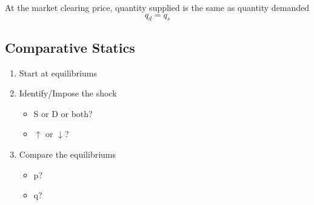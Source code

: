 \documentclass{article}
\begin{document}
\begin{spacing}{1.2}
    \newpage
    At the market clearing price, quantity supplied is the same as quantity demanded 
    \[q_d=q_s\]
    \subsection*{Comparative Statics}
    \begin{enumerate}
        \item Start at equilibriums
        \item Identify/Impose the shock
        \begin{itemize}
            \item S or D or both?
            \item \(\uparrow\) or \(\downarrow\)?
        \end{itemize}
        \item Compare the equilibriums
        \begin{itemize}
            \item p?
            \item q?
        \end{itemize}
    \end{enumerate}
\end{spacing}
\end{document}
